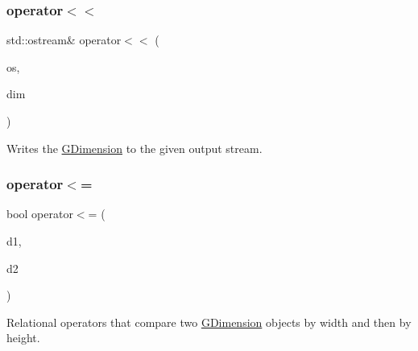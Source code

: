 \mbox{\label{structsgl_1_1GDimension_a528e8a99e8c635db2eab715975ad0e8d}} 
\subsubsection{\texorpdfstring{operator$<$$<$}{operator<<}}
{\footnotesize\ttfamily std\+::ostream\& operator$<$$<$ (\begin{DoxyParamCaption}\item[{std\+::ostream \&}]{os,  }\item[{const \mbox{\hyperlink{structsgl_1_1GDimension}{G\+Dimension}} \&}]{dim }\end{DoxyParamCaption})\hspace{0.3cm}{\ttfamily [friend]}}



Writes the \mbox{\hyperlink{structsgl_1_1GDimension}{G\+Dimension}} to the given output stream. 

\mbox{\label{structsgl_1_1GDimension_af6f17bbe9041aee1572fc7be059bec62}} 
\subsubsection{\texorpdfstring{operator$<$=}{operator<=}}
{\footnotesize\ttfamily bool operator$<$= (\begin{DoxyParamCaption}\item[{const \mbox{\hyperlink{structsgl_1_1GDimension}{G\+Dimension}} \&}]{d1,  }\item[{const \mbox{\hyperlink{structsgl_1_1GDimension}{G\+Dimension}} \&}]{d2 }\end{DoxyParamCaption})\hspace{0.3cm}{\ttfamily [friend]}}



Relational operators that compare two \mbox{\hyperlink{structsgl_1_1GDimension}{G\+Dimension}} objects by width and then by height. 

\mbox{\label{structsgl_1_1GDimension_a6bdb9d07a69c8f061d887e6f24750640}} 
